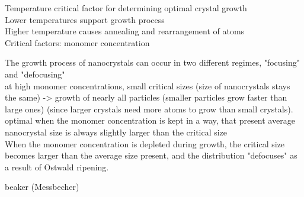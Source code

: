 		Temperature critical factor for determining optimal crystal growth	\\
		Lower temperatures support growth process														\\
		Higher temperature causes annealing and rearrangement of atoms			\\
		Critical factors: monomer concentration
		
		
		The growth process of nanocrystals can occur in two different regimes, "focusing" and "defocusing" \\
		
		at high monomer concentrations, small critical sizes (size of nanocrystals stays the same) -> growth of
		nearly all particles (smaller particles grow faster than large ones) (since larger crystals need more atoms to
		grow than small crystals). 
		optimal when the monomer concentration is kept in a way, that present average nanocrystal size is always
		slightly larger than the critical size \\
		When the monomer concentration is depleted during growth, the critical size becomes larger than the average size present, and the
		distribution "defocuses" as a result of Ostwald ripening.
		
		
		beaker (Messbecher)
		